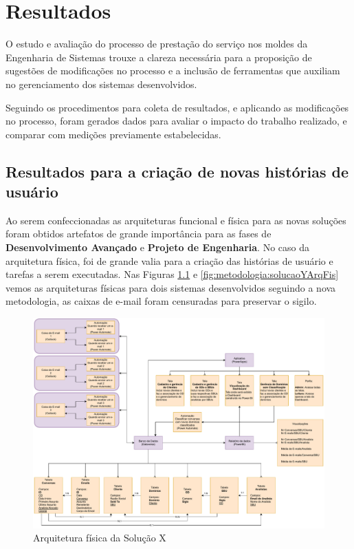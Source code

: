 
\chapter{Resultados}\label{chap:resultados}

	O estudo e avaliação do processo de prestação do serviço nos moldes da Engenharia de Sistemas trouxe a clareza necessária para a proposição de sugestões de modificações no
	processo e a inclusão de ferramentas que auxiliam no gerenciamento dos sistemas desenvolvidos. 
	
	Seguindo os procedimentos para coleta de resultados, e aplicando as modificações no processo, foram gerados dados para avaliar o impacto do trabalho realizado, e comparar com medições
	previamente estabelecidas. 

	\section{Resultados para a criação de novas histórias de usuário}

	Ao serem confeccionadas as arquiteturas funcional e física para as novas soluções foram obtidos artefatos de grande importância para as
	fases de \textbf{Desenvolvimento Avançado} e \textbf{Projeto de Engenharia}. No caso da arquitetura física, foi de grande valia para a criação das
	histórias de usuário e tarefas a serem executadas. Nas Figuras \ref{fig:metodologia:solucaoXArqFis} e \ref{fig:metodologia:solucaoYArqFis} vemos as arquiteturas físicas para dois sistemas desenvolvidos seguindo
	a nova metodologia, as caixas de e-mail foram censuradas para preservar o sigilo.

	\begin{figure}[!h]
		\centering
		\includegraphics[width=1\textwidth]{./figuras/solucaoXArqFis.pdf}
		\caption{Arquitetura física da Solução X}
		\label{fig:metodologia:solucaoXArqFis}
	\end{figure}
	
